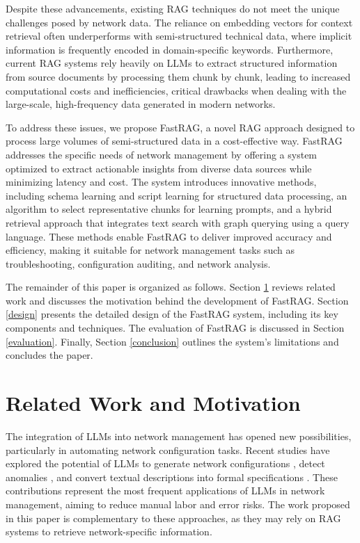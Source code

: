 \documentclass[conference]{IEEEtran}
\begin{document}
Despite these advancements, existing RAG techniques do not meet the unique challenges posed by network data. The reliance on embedding vectors for context retrieval often underperforms with semi-structured technical data, where implicit information is frequently encoded in domain-specific keywords. Furthermore, current RAG systems rely heavily on LLMs to extract structured information from source documents by processing them chunk by chunk, leading to increased computational costs and inefficiencies, critical drawbacks when dealing with the large-scale, high-frequency data generated in modern networks.

To address these issues, we propose FastRAG, a novel RAG approach designed to process large volumes of semi-structured data in a cost-effective way. FastRAG addresses the specific needs of network management by offering a system optimized to extract actionable insights from diverse data sources while minimizing latency and cost. 
The system introduces innovative methods, including schema learning and script learning for structured data processing, an algorithm to select representative chunks for learning prompts, and a hybrid retrieval approach that integrates text search with graph querying using a query language.
These methods enable FastRAG to deliver improved accuracy and efficiency, making it suitable for network management tasks such as troubleshooting, configuration auditing, and network analysis.

The remainder of this paper is organized as follows. Section \ref{rw} reviews related work and discusses the motivation behind the development of FastRAG. Section \ref{design} presents the detailed design of the FastRAG system, including its key components and techniques. The evaluation of FastRAG is discussed in Section \ref{evaluation}. Finally, Section \ref{conclusion} outlines the system's limitations and concludes the paper.


\section{Related Work and Motivation}\label{rw}
The integration of LLMs into network management has opened new possibilities, particularly in automating network configuration tasks. Recent studies have explored the potential of LLMs to generate network configurations \cite{jeong2024switchLlm,rajdeep2023LlmRouterConfig,wang2023NetworkConfigHuman}, detect anomalies \cite{le2023LogParsingPrompt}, and convert textual descriptions into formal specifications \cite{donadel2024LlmUnderstandComputerNetworks, ifland2024GenetMultimodalCopilot}. 
These contributions represent the most frequent applications of LLMs in network management, aiming to reduce manual labor and error risks.
The work proposed in this paper is complementary to these approaches, as they may rely on RAG systems to retrieve network-specific information. 
\end{document}
